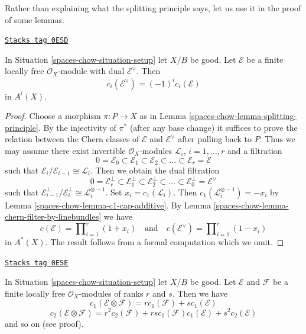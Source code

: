 Rather than explaining what the splitting principle says, let
us use it in the proof of some lemmas.

\begin{lemma}
\label{spaces-chow-lemma-chern-classes-dual}
\href{https://stacks.math.columbia.edu/tag/0ESD}{\texttt{Stacks tag 0ESD}}

In Situation \ref{spaces-chow-situation-setup} let $X/B$ be good.
Let $\mathcal{E}$ be a finite locally free $\mathcal{O}_X$-module
with dual $\mathcal{E}^\vee$. Then
$$
c_i(\mathcal{E}^\vee) = (-1)^i c_i(\mathcal{E})
$$
in $A^i(X)$.
\end{lemma}

\begin{proof}
Choose a morphism $\pi : P \to X$ as in
Lemma \ref{spaces-chow-lemma-splitting-principle}.
By the injectivity of $\pi^*$ (after any base change)
it suffices to prove the relation between
the Chern classes of $\mathcal{E}$ and $\mathcal{E}^\vee$
after pulling back to $P$. Thus we may assume there
exist invertible $\mathcal{O}_X$-modules
${\mathcal L}_i$, $i = 1, \ldots, r$
and a filtration
$$
0 = \mathcal{E}_0 \subset \mathcal{E}_1 \subset \mathcal{E}_2
\subset \ldots \subset \mathcal{E}_r = \mathcal{E}
$$
such that $\mathcal{E}_i/\mathcal{E}_{i - 1} \cong \mathcal{L}_i$.
Then we obtain the dual filtration
$$
0 = \mathcal{E}_r^\perp \subset \mathcal{E}_1^\perp \subset \mathcal{E}_2^\perp
\subset \ldots \subset \mathcal{E}_0^\perp = \mathcal{E}^\vee
$$
such that $\mathcal{E}_{i - 1}^\perp/\mathcal{E}_i^\perp \cong
\mathcal{L}_i^{\otimes -1}$.
Set $x_i = c_1(\mathcal{L}_i)$.
Then $c_1(\mathcal{L}_i^{\otimes -1}) = - x_i$
by Lemma \ref{spaces-chow-lemma-c1-cap-additive}.
By Lemma \ref{spaces-chow-lemma-chern-filter-by-linebundles}
we have
$$
c(\mathcal{E}) = \prod\nolimits_{i = 1}^r (1 + x_i)
\quad\text{and}\quad
c(\mathcal{E}^\vee) = \prod\nolimits_{i = 1}^r (1 - x_i)
$$
in $A^*(X)$. The result follows from a formal computation
which we omit.
\end{proof}

\begin{lemma}
\label{spaces-chow-lemma-chern-classes-tensor-product}
\href{https://stacks.math.columbia.edu/tag/0ESE}{\texttt{Stacks tag 0ESE}}

In Situation \ref{spaces-chow-situation-setup} let $X/B$ be good.
Let $\mathcal{E}$ and $\mathcal{F}$ be a finite locally free
$\mathcal{O}_X$-modules of ranks $r$ and $s$. Then we have
$$
c_1(\mathcal{E} \otimes \mathcal{F})
=
r c_1(\mathcal{F}) + s c_1(\mathcal{E})
$$
$$
c_2(\mathcal{E} \otimes \mathcal{F})
=
r^2 c_2(\mathcal{F}) +
rs c_1(\mathcal{F})c_1(\mathcal{E}) +
s^2 c_2(\mathcal{E})
$$
and so on (see proof).
\end{lemma}


